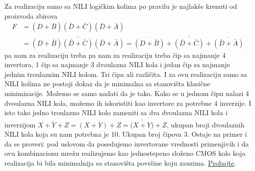 \begin{frame}[label=02-s049]
\gusttekst
Za realizaciju samo sa NILI logičkim kolima po pravilu je najlakše krenuti od proizvoda zbirova
\[
\begin{aligned}
F&=(D+\bar B)(\bar D+\bar C)(\bar D+\bar A)\\
 &=\overline{\overline{(D+\bar B)(\bar D+\bar C)(\bar D+\bar A)}}
 =\overline{\overline{(D+\bar B)}+\overline{(\bar D+\bar C)}+\overline{(\bar D+\bar A)}}
\end{aligned}
\]
pa nam za realizaciju treba pa nam za realizaciju treba čip sa najmanje 4 invertora, 1 čip sa najmanje 3 dvoulazna NILI kola i jedan čip sa najmanje jednim troulaznim NILI kolom. Tri čipa ali različita. I za ovu realizaciju samo sa NILI kolima ne postoji dokaz da je minimalna sa stanovišta klasične minimizacije. Možemo se samo nadati da je tako. Kako se u jednom čipu nalazi 4 dvoulazna NILI kola, možemo ih iskoristiti kao invertore za potrebne 4 inverzije. I isto tako jedno troulazno NILI kolo zameniti sa dva dvoulazna NILI kola i inverzijom
\(\overline{X+Y+Z}=\overline{(X+Y)+Z}=\overline{\bigl(\overline{\overline{X+Y}}\bigr)+Z}\),
ukupan broji dvoulaznih NILI kola koja su nam potrebna je 10. Ukupan broj čipova 3. Ostaje na primer i da se proveri: pod uslovom da posedujemo invertovane vrednosti primenjivih i da ovu kombinacionu mrežu realizujemo kao jednostepeno složeno CMOS kolo koja realizacija bi bila minimalnija sa stanovišta površine koju zauzima. \underline{Probajte}.
\end{frame}
